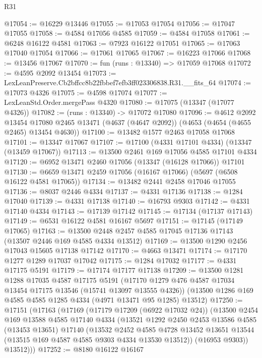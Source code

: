 \begin{lexlean}{R31}
\begin{coremodule}
@17054 := @16229 @13446
@17055 := @17053 @17054
@17056 := @17047 @17055
@17058 := @4584 @17056 @4585
@17059 := @4584 @17058
@17061 := @6248 @16122 @4581
@17063 := @7923 @16122 @17051
@17065 := @17063 @17040 @17054
@17066 := @17061 @17065
@17067 := @16223 @17066
@17068 := @13456 @17067
@17070 := fun (runs : @13340) => @17059 @17068
@17072 := @4595 @2092 @13454
@17073 := LexLeanPreserve.Cb2bffcc8b22fbbef7efb3ff023306838.R31.__fits_64
@17074 := @17073 @4326
@17075 := @4598 @17074
@17077 := LexLeanStd.Order.mergePass @4320
@17080 := @17075 (@13347 (@17077 @4326))
@17082 := (runs : @13340) -> @17072 @17080
@17096 := @4612
    @2092
    @13454
    @17080
    @2465
    @13471
    (@4637 (@4647 @2092))
    (@4653 (@4654 (@4655 @2465) @13454 @4630))
@17100 := @13482 @1577 @2463 @17058 @17068
@17101 := @13347 @17067
@17107 := @17100 (@4331 @17101 @4334) (@13347 (@13459 @17067))
@17113 := @13500 @2461 @169 @17056 @4585 @17101 @4334
@17120 := @6952 @13471 @2460 @17056 (@13347 (@16128 @17066)) @17101
@17130 := @6659 @13471 @2459 @17056 (@16167 @17066) (@5697 (@6508 @16122 @4581 @17065))
@17134 := @13482 @2441 @2458 @17046 @17055
@17136 := @8037 @2446 @4334
@17137 := @4331 @17136
@17138 := @1284 @17040
@17139 := @4331 @17138
@17140 := @16793 @9303
@17142 := @4331 @17140 @4334
@17143 := @17139 @17142
@17145 := @17134 (@17137 @17143)
@17149 := @6531 @16122 @4581 @16167 @5697
@17151 := @17145 (@17149 @17065)
@17163 := @13500 @2448 @2457 @4585 @17045 @17136 @17143 (@13507 @2446 @169 @4585 @4334 @13512)
@17169 := @13500 @1290 @2456 @17043 @15605 @17138 @17142
@17170 := @4663 @13471
@17174 := @17170 @1277 @1289 @17037 @17042
@17175 := @1284 @17032
@17177 := @4331 @17175 @5191
@17179 := @17174 @17177 @17138
@17209 := @13500
    @1281
    @1288
    @17035
    @4587
    @17175
    @5191
    (@17170 @1279 @476 @4587 @17034 @13454 @17175 @13546 (@15741 @13097 @13555 @4326))
    (@13500 @1286 @169 @4585 @4585 @1285 @4334 (@4971 @13471 @95 @1285) @13512)
@17250 := @17151
    (@17163
      (@17169
        (@17179 @17209 (@6922 @17032 @24))
        (@13500
          @2454
          @169
          @13588
          @4585
          @17140
          @4334
          (@13521
            @1292
            @2450
            @2453
            @13586
            @4585
            (@13453 @13651)
            @17140
            (@13532
              @2452
              @4585
              @4728
              @13452
              @13651
              @13544
              (@13515 @169 @4587 @4585 @9303 @4334 @13530 @13512))
            (@16953 @9303))
          @13512)))
@17252 := @8180 @16122 @16167

\end{coremodule}
\end{lexlean}
